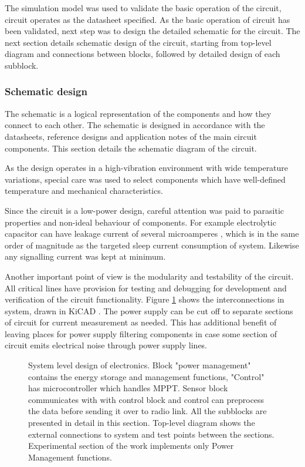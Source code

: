 The simulation model was used to validate the basic operation of the circuit, circuit operates as the datasheet specified. As the basic operation of circuit has been validated, next step was to design the detailed schematic for the circuit. The next section details schematic design of the circuit, starting from top-level diagram and connections between blocks, followed by detailed design of each subblock. 

\subsubsection{Schematic design}
The schematic is a logical representation of the components and how they connect to each other. The schematic is designed in accordance with the datasheets, reference designs and application notes of the main circuit components. This section details the schematic diagram of the circuit.

As the design operates in a high-vibration environment with wide temperature variations, special care was used to select components which have well-defined temperature and mechanical characteristics. 

Since the circuit is a low-power design, careful attention was paid to parasitic properties and non-ideal behaviour of components. For example electrolytic capacitor can have leakage current of several microamperes \cite{Both2001}, which is in the same order of magnitude as the targeted sleep current consumption of system. Likewise any signalling current was kept at minimum. 

Another important point of view is the modularity and testability of the circuit. All critical lines have provision for testing and debugging for development and verification of the circuit functionality. Figure \ref{fig:circuit_blocklevel} shows the interconnections in system, drawn in KiCAD \cite{KiCAD}.  The power supply can be cut off to separate sections of circuit for current measurement as needed. This has additional benefit of leaving places for power supply filtering components in case some section of circuit emits electrical noise through power supply lines.

\begin{figure}[htb]
    \centering
    \def\svgwidth{\columnwidth}
    
    \caption{\label{fig:circuit_blocklevel} System level design of electronics. Block "power management" contains the energy storage and management functions, "Control" has microcontroller which handles MPPT. Sensor block communicates with with control block and control can preprocess the data before sending it over to radio link. All the subblocks are presented in detail in this section. Top-level diagram shows the external connections to system and test points between the sections. Experimental section of the work implements only Power Management functions.}
\end{figure}

